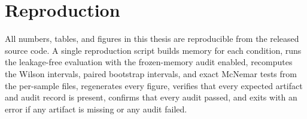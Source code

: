 \documentclass[14pt,a4paper]{extreport}
\begin{document}
\chapter{Reproduction}

All numbers, tables, and figures in this thesis are reproducible from the released source code. A single reproduction script builds memory for each condition, runs the leakage-free evaluation with the frozen-memory audit enabled, recomputes the Wilson intervals, paired bootstrap intervals, and exact McNemar tests from the per-sample files, regenerates every figure, verifies that every expected artifact and audit record is present, confirms that every audit passed, and exits with an error if any artifact is missing or any audit failed.
\end{document}
